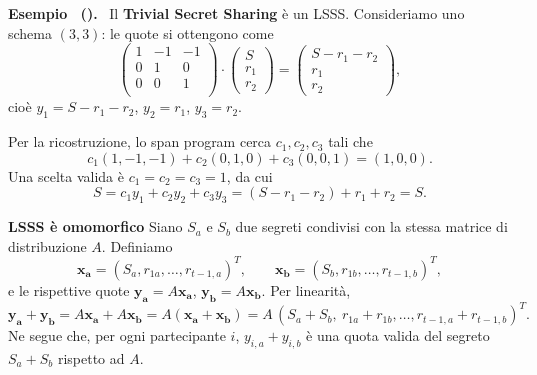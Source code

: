 \documentclass[a4paper, 11pt]{article}
\newenvironment{example}[1][]{
  \par\noindent\textbf{Esempio%
  \if\relax\detokenize{#1}\relax\else\ (\textbf{#1})\fi.}\ }{}
\begin{document}
\begin{example}
    Il \textbf{Trivial Secret Sharing} è un LSSS. Consideriamo uno schema $(3,3)$: le quote si ottengono come
    \[
    \begin{pmatrix}
    1 & -1 & -1 \\
    0 & 1 & 0 \\
    0 & 0 & 1 \\
    \end{pmatrix}
    \cdot
    \begin{pmatrix}
    S \\ r_1 \\ r_2
    \end{pmatrix}
    =
    \begin{pmatrix}
    S - r_1 - r_2 \\ r_1 \\ r_2
    \end{pmatrix},
    \]
    cioè $y_1=S-r_1-r_2$, $y_2=r_1$, $y_3=r_2$.

    Per la ricostruzione, lo span program cerca $c_1,c_2,c_3$ tali che
    \[
    c_1(1,-1,-1)+c_2(0,1,0)+c_3(0,0,1)=(1,0,0).
    \]
    Una scelta valida è $c_1=c_2=c_3=1$, da cui
    \[
    S=c_1y_1+c_2y_2+c_3y_3=(S-r_1-r_2)+r_1+r_2=S.
    \]
\end{example}

\textbf{LSSS è omomorfico}
Siano $S_a$ e $S_b$ due segreti condivisi con la stessa matrice di distribuzione $A$. Definiamo
\[
\mathbf{x_a}=(S_a, r_{1a}, \dots, r_{t-1,a})^T,\qquad
\mathbf{x_b}=(S_b, r_{1b}, \dots, r_{t-1,b})^T,
\]
e le rispettive quote $\mathbf{y_a}=A\mathbf{x_a}$, $\mathbf{y_b}=A\mathbf{x_b}$. Per linearità,
\[
\mathbf{y_a}+\mathbf{y_b}=A\mathbf{x_a}+A\mathbf{x_b}=A(\mathbf{x_a}+\mathbf{x_b})
= A\,(S_a+S_b,\ r_{1a}+r_{1b},\dots, r_{t-1,a}+r_{t-1,b})^T.
\]
Ne segue che, per ogni partecipante $i$, $y_{i,a}+y_{i,b}$ è una quota valida del segreto $S_a+S_b$ rispetto ad $A$.

\newpage
\end{document}
